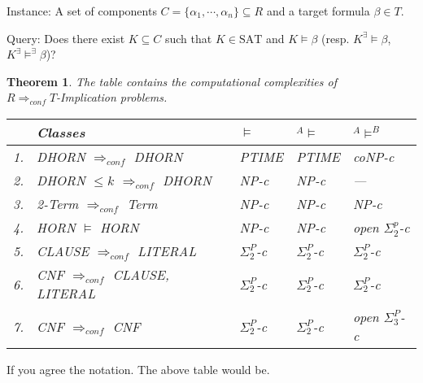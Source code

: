 \documentclass[12pt]{article}
\newcommand{\AMB}{\mbox{$^A$\hspace{-0.5mm}$\models^B$}}
\newcommand{\AM}{\mbox{$^A$\hspace{-0.5mm}$\models$}}
\newtheorem{theorem}{Theorem}[section]
\begin{document}
\begin{description}
\item {Instance:} A set of components $C=\{\alpha_1,\cdots, \alpha_n\}\subseteq R$ and a target formula $\beta\in T$.
\item {Query:} Does there exist $K\subseteq C$ such that $K\in \mbox{SAT}$ and $K\models \beta$ (resp. $K^\exists\!\!\models \beta$, $K
^\exists\!\!\models^\exists\beta$)?
\end{description} 
\color{black}


\begin{theorem}
The table contains the computational complexities of\\ $R \Longrightarrow_{conf} T$-Implication problems.\\
\begin{tabular}{|l|l|l|l|l|}
\hline
 & {\em Classes} &  $\models$ & \AM & \AMB \\ \hline
1. & DHORN $\Rightarrow_{conf}$ DHORN          & PTIME & PTIME  & coNP-c         \\ \hline
2. & DHORN $\leq k$ $\Rightarrow_{conf}$ DHORN & NP-c  & NP-c   & ---         \\ \hline
3. & 2-Term $\Rightarrow_{conf}$ Term          & NP-c  & NP-c   & NP-c           \\ \hline
4. & HORN $\models$ HORN                       & NP-c  & NP-c   & open $\Sigma^p_2$-c \\ \hline
5. & CLAUSE $\Rightarrow_{conf}$ LITERAL       & $\Sigma_2^P$-c & $\Sigma_2^P$-c & $\Sigma_2^P$-c \\ \hline
6. & CNF $\Rightarrow_{conf}$ CLAUSE, LITERAL  & $\Sigma_2^P$-c & $\Sigma_2^P$-c & $\Sigma_2^P$-c \\ \hline
7. & CNF $\Rightarrow_{conf}$ CNF              & $\Sigma_2^P$-c & $\Sigma_2^P$-c & open $\Sigma_3^P$-c \\ \hline
\end{tabular}
\end{theorem}

\color{red}
\noindent If you agree the notation. The above table would be.\\
\end{document}
